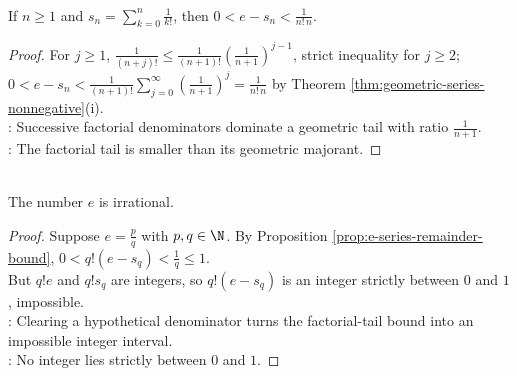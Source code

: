 \begin{proposition} \label{prop:e-series-remainder-bound} \\
If $n\geq1$ and $s_n=\sum\limits_{k=0}^{n}\frac{1}{k!}$, then $0<e-s_n<\frac{1}{n!\,n}$.
\begin{proof}
For $j\geq1$, $\frac{1}{(n+j)!}\leq\frac{1}{(n+1)!}\left(\frac{1}{n+1}\right)^{j-1}$,  strict inequality for $j\geq2$; $0<e-s_n<\frac{1}{(n+1)!}\sum\limits_{j=0}^{\infty}\left(\frac{1}{n+1}\right)^j=\frac{1}{n!\,n}$ by Theorem \ref{thm:geometric-series-nonnegative}(i).\\
: Successive factorial denominators dominate a geometric tail with ratio $\frac{1}{n+1}$.\\
: The factorial tail is smaller than its geometric majorant.
\end{proof}
\end{proposition}

\begin{theorem} \label{thm:e-irrational} \\
The number $e$ is irrational.
\begin{proof}
Suppose $e=\frac{p}{q}$ with $p,q\in\N$. By Proposition \ref{prop:e-series-remainder-bound}, $0<q!(e-s_q)<\frac{1}{q}\leq1$.\\
But $q!e$ and $q!s_q$ are integers, so $q!(e-s_q)$ is an integer strictly between $0$ and $1$, impossible.\\
: Clearing a hypothetical denominator turns the factorial-tail bound into an impossible integer interval.\\
: No integer lies strictly between $0$ and $1$.
\end{proof}
\end{theorem}

